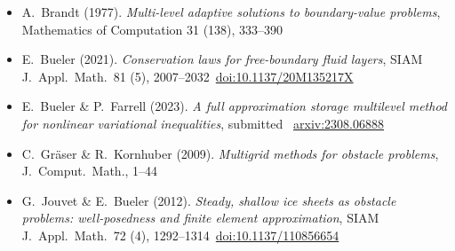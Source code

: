 
\newcommand{\sdoi}[1]{\,{\tiny \href{https://doi.org/#1}{doi:#1}}}
\begin{itemize}
\item A.~Brandt (1977). \emph{Multi-level adaptive solutions to boundary-value problems}, Mathematics of Computation 31 (138), 333--390
\item E.~Bueler (2021). \emph{Conservation laws for free-boundary fluid layers}, SIAM J.~Appl.~Math.~81 (5), 2007--2032 \sdoi{10.1137/20M135217X}
\item E.~Bueler \& P.~Farrell (2023).  \emph{A full approximation storage multilevel method for nonlinear variational inequalities}, submitted \, {\tiny \href{https://arxiv.org/abs/2308.06888}{arxiv:2308.06888}}
\item C.~Gr{\"a}ser \& R.~Kornhuber (2009). \emph{Multigrid methods for obstacle problems}, J.~Comput.~Math., 1--44
\item G.~Jouvet \& E.~Bueler (2012). \emph{Steady, shallow ice sheets as obstacle problems: well-posedness and finite element approximation}, SIAM J.~Appl.~Math.~72 (4), 1292--1314 \sdoi{10.1137/110856654}

\end{itemize}
